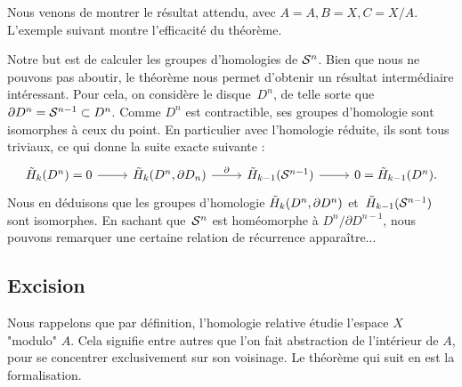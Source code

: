 Nous venons de montrer le résultat attendu, avec $A=A,B=X, C=X/A$. L'exemple suivant montre l'efficacité du théorème.

\begin{exemple}
Notre but est de calculer les groupes d'homologies de $\mathcal{S}^{n}$. Bien que nous ne pouvons pas aboutir, le théorème nous permet d'obtenir un résultat intermédiaire intéressant. Pour cela, on considère le disque~$D^n$, de telle sorte que $\partial D^n=\mathcal{S}^{n-1}\subset D^n$. Comme $D^n$ est contractible, ses groupes d'homologie sont isomorphes à ceux du point. En particulier avec l'homologie réduite, ils sont tous triviaux, ce qui donne la suite exacte suivante :\[\begin{tikzcd}
\Tilde{H}_k(D^n)=0\arrow[r]&\Tilde{H}_k(D^n,\partial D_n)\arrow[r,"\partial"]&\Tilde{H}_{k-1}(\s{n-1})\arrow[r]&0=\Tilde{H}_{k-1}(D^n).
\end{tikzcd}\]Nous en déduisons que les groupes d'homologie $\Tilde{H}_k(D^n,\partial D^n)$ et~$\Tilde{H}_{k-1}(\mathcal{S}^{n-1})$ sont isomorphes. En sachant que~$\mathcal{S}^{n}$ est homéomorphe à $D^n/\partial D^{n-1}$, nous pouvons remarquer une certaine relation de récurrence apparaître...
\end{exemple}

\subsection{Excision}

Nous rappelons que par définition, l'homologie relative étudie l'espace $X$ "modulo" $A$. Cela signifie entre autres que l'on fait abstraction de l'intérieur de $A$, pour se concentrer exclusivement sur son voisinage. Le théorème qui suit en est la formalisation.

